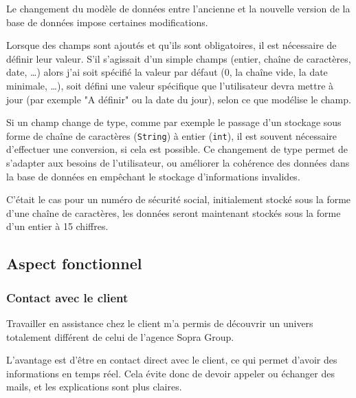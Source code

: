 Le changement du modèle de données entre l'ancienne et la nouvelle version de la base de données impose certaines modifications.

Lorsque des champs sont ajoutés et qu'ils sont obligatoires, il est nécessaire de définir leur valeur.
S'il s'agissait d'un simple champs (entier, chaîne de caractères, date, \ldots) alors j'ai soit spécifié la valeur par défaut (0, la chaîne vide, la date minimale, \ldots), soit défini une valeur spécifique que l'utilisateur devra mettre à jour (par exemple "A définir" ou la date du jour), selon ce que modélise le champ.

Si un champ change de type, comme par exemple le passage d'un stockage sous forme de chaîne de caractères (\lstinline{String}) à entier (\lstinline{int}), il est souvent nécessaire d'effectuer une conversion, si cela est possible.
Ce changement de type permet de s'adapter aux besoins de l'utilisateur, ou améliorer la cohérence des données dans la base de données en empêchant le stockage d'informations invalides.

C'était le cas pour un numéro de sécurité social, initialement stocké sous la forme d'une chaîne de caractères, les données seront maintenant stockés sous la forme d'un entier à 15 chiffres.


\subsection{Aspect fonctionnel}


\subsubsection{Contact avec le client}

Travailler en assistance chez le client m'a permis de découvrir un univers totalement différent de celui de l'agence Sopra Group.

L'avantage est d'être en contact direct avec le client, ce qui permet d'avoir des informations en temps réel. Cela évite donc de devoir appeler ou échanger des mails, et les explications sont plus claires.

